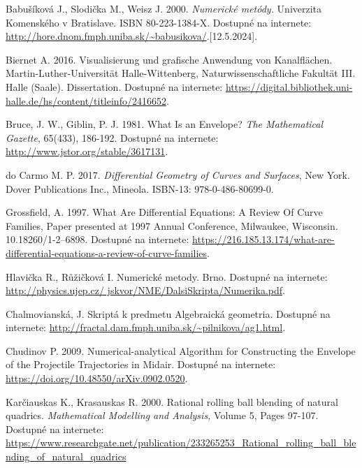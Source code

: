 \documentclass[12pt, twoside]{book}
\theoremstyle{definition}
\begin{document}


\newpage	

\backmatter

\thispagestyle{empty}
\nocite{*}
\clearpage


 

\begin{thebibliography}{99}

 Babušíková J., Slodička M., Weisz J. 2000. \textit{Numerické metódy.} Univerzita Komenského v Bratislave. ISBN 80-223-1384-X. Dostupné na internete: \url{http://hore.dnom.fmph.uniba.sk/~babusikova/}.[12.5.2024].

 Biernet A. 2016. Visualisierung und grafische Anwendung von Kanalflächen. Martin-Luther-Universität Halle-Wittenberg, Naturwissenschaftliche Fakultät III. Halle (Saale). Dissertation. Dostupné na internete: \url{https://digital.bibliothek.uni-halle.de/hs/content/titleinfo/2416652}.

 Bruce, J. W., Giblin, P. J. 1981. What Is an Envelope? \textit{The Mathematical Gazette}, 65(433), 186-192. Dostupné na internete: \url{http://www.jstor.org/stable/3617131}.

 do Carmo M. P. 2017. \textit{Differential Geometry of Curves and Surfaces}, New York. Dover Publications Inc., Mineola. ISBN-13: 978-0-486-80699-0.

 Grossfield, A. 1997. What Are Differential Equations: A Review Of Curve Families, Paper presented at 1997 Annual Conference, Milwaukee, Wisconsin. 10.18260/1-2--6898. Dostupné na internete: \url{https://216.185.13.174/what-are-differential-equations-a-review-of-curve-families}.

 Hlavička R., Růžičková I. Numerické metody. Brno. Dostupné na internete: \url{http://physics.ujep.cz/ jskvor/NME/DalsiSkripta/Numerika.pdf}.

 Chalmovianská, J. Skriptá k predmetu Algebraická geometria. Dostupné na internete: \url{http://fractal.dam.fmph.uniba.sk/~pilnikova/ag1.html}.

 Chudinov P. 2009. Numerical-analytical Algorithm for Constructing the Envelope of the Projectile Trajectories in Midair. Dostupné na internete: \url{https://doi.org/10.48550/arXiv.0902.0520}.

 Karčiauskas K., Krasauskas R. 2000. Rational rolling ball blending of natural quadrics. \textit{Mathematical Modelling and Analysis,} Volume 5, Pages 97-107. Dostupné na internete: \url{https://www.researchgate.net/publication/233265253_Rational_rolling_ball_blending_of_natural_quadrics}


\end{thebibliography}
\end{document}
